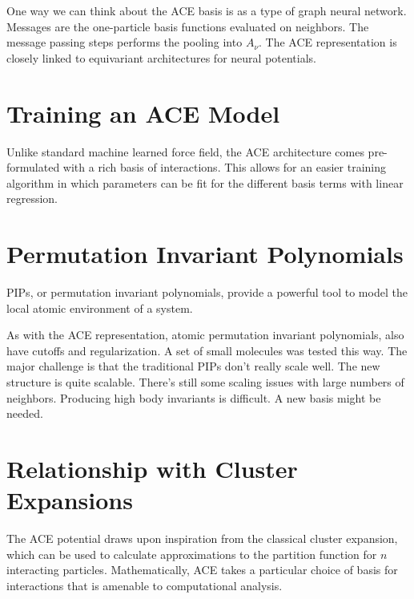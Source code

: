 \documentclass[book.tex]{subfiles}
\begin{document}
One way we can think about the ACE basis is as a type of graph neural network. Messages are the one-particle basis functions evaluated on neighbors. The message passing steps performs the pooling into $A_\nu$. The ACE representation is closely linked to equivariant architectures for neural potentials.


\section{Training an ACE Model}
Unlike standard machine learned force field, the ACE architecture comes pre-formulated with a rich basis of interactions. This allows for an easier training algorithm in which parameters can be fit for the different basis terms with linear regression. 

\section{Permutation Invariant Polynomials}

PIPs, or permutation invariant polynomials, provide a powerful tool to model the local atomic environment of a system.

As with the ACE representation, atomic permutation invariant polynomials, also have cutoffs and regularization. A set of small molecules was tested this way. The major challenge is that the traditional PIPs don't really scale well. The new structure is quite scalable. There's still some scaling issues with large numbers of neighbors. Producing high body invariants is difficult. A new basis might be needed.


\section{Relationship with Cluster Expansions}

The ACE potential draws upon inspiration from the classical cluster expansion, which can be used to calculate approximations to the partition function for $n$ interacting particles. Mathematically, ACE takes a particular choice of basis for interactions that is amenable to computational analysis.
\end{document}
